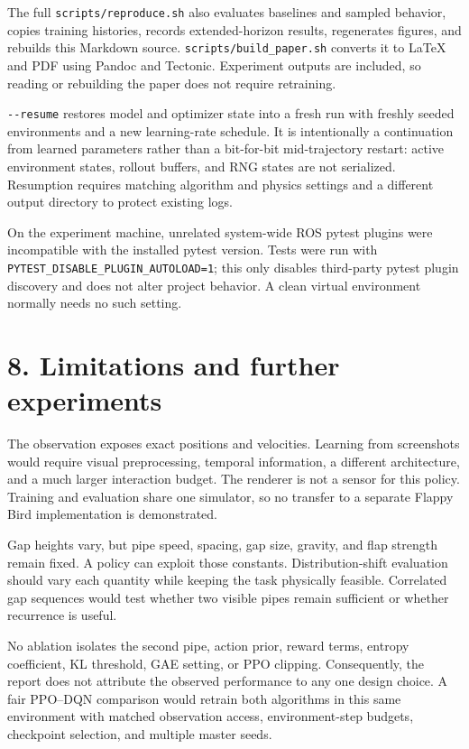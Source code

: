 \documentclass[
  11pt,
]{article}
\begin{document}
The full \texttt{scripts/reproduce.sh} also evaluates baselines and
sampled behavior, copies training histories, records extended-horizon
results, regenerates figures, and rebuilds this Markdown source.
\texttt{scripts/build\_paper.sh} converts it to LaTeX and PDF using
Pandoc and Tectonic. Experiment outputs are included, so reading or
rebuilding the paper does not require retraining.

\texttt{-\/-resume} restores model and optimizer state into a fresh run
with freshly seeded environments and a new learning-rate schedule. It is
intentionally a continuation from learned parameters rather than a
bit-for-bit mid-trajectory restart: active environment states, rollout
buffers, and RNG states are not serialized. Resumption requires matching
algorithm and physics settings and a different output directory to
protect existing logs.

On the experiment machine, unrelated system-wide ROS pytest plugins were
incompatible with the installed pytest version. Tests were run with
\texttt{PYTEST\_DISABLE\_PLUGIN\_AUTOLOAD=1}; this only disables
third-party pytest plugin discovery and does not alter project behavior.
A clean virtual environment normally needs no such setting.

\section{8. Limitations and further
experiments}\label{limitations-and-further-experiments}

The observation exposes exact positions and velocities. Learning from
screenshots would require visual preprocessing, temporal information, a
different architecture, and a much larger interaction budget. The
renderer is not a sensor for this policy. Training and evaluation share
one simulator, so no transfer to a separate Flappy Bird implementation
is demonstrated.

Gap heights vary, but pipe speed, spacing, gap size, gravity, and flap
strength remain fixed. A policy can exploit those constants.
Distribution-shift evaluation should vary each quantity while keeping
the task physically feasible. Correlated gap sequences would test
whether two visible pipes remain sufficient or whether recurrence is
useful.

No ablation isolates the second pipe, action prior, reward terms,
entropy coefficient, KL threshold, GAE setting, or PPO clipping.
Consequently, the report does not attribute the observed performance to
any one design choice. A fair PPO--DQN comparison would retrain both
algorithms in this same environment with matched observation access,
environment-step budgets, checkpoint selection, and multiple master
seeds.
\end{document}
